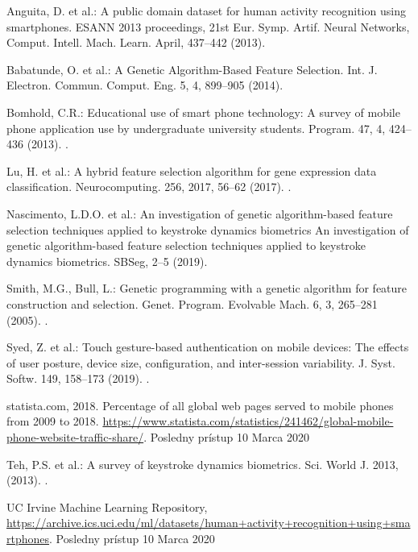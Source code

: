 \documentclass[runningheads]{llncs}
\begin{document}
\begin{thebibliography}{8}

Anguita, D. et al.: A public domain dataset for human activity recognition using smartphones. ESANN 2013 proceedings, 21st Eur. Symp. Artif. Neural Networks, Comput. Intell. Mach. Learn. April, 437–442 (2013).

Babatunde, O. et al.: A Genetic Algorithm-Based Feature Selection. Int. J. Electron. Commun. Comput. Eng. 5, 4, 899–905 (2014).

Bomhold, C.R.: Educational use of smart phone technology: A survey of mobile phone application use by undergraduate university students. Program. 47, 4, 424–436 (2013). .

Lu, H. et al.: A hybrid feature selection algorithm for gene expression data classification. Neurocomputing. 256, 2017, 56–62 (2017). .

Nascimento, L.D.O. et al.: An investigation of genetic algorithm-based feature selection techniques applied to keystroke dynamics biometrics An investigation of genetic algorithm-based feature selection techniques applied to keystroke dynamics biometrics. SBSeg, 2–5 (2019).

Smith, M.G., Bull, L.: Genetic programming with a genetic algorithm for feature construction and selection. Genet. Program. Evolvable Mach. 6, 3, 265–281 (2005). .

Syed, Z. et al.: Touch gesture-based authentication on mobile devices: The effects of user posture, device size, configuration, and inter-session variability. J. Syst. Softw. 149, 158–173 (2019). .

statista.com, 2018. Percentage of all global web pages served to mobile phones from 2009 to 2018. \url{https://www.statista.com/statistics/241462/global-mobile-phone-website-traffic-share/}. Posledny prístup 10 Marca 2020

Teh, P.S. et al.: A survey of keystroke dynamics biometrics. Sci. World J. 2013, (2013). .

UC Irvine Machine Learning Repository, \url{https://archive.ics.uci.edu/ml/datasets/human+activity+recognition+using+smartphones}. Posledny prístup 10 Marca 2020


\end{thebibliography}
\end{document}
